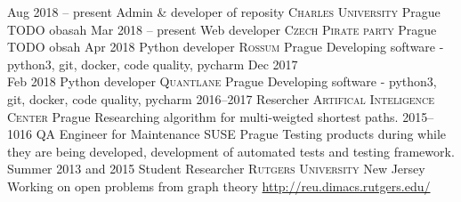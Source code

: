 \cventry
    {Aug 2018 -- present}
    {Admin \& developer of reposity}
    {\textsc{Charles University}}
    {Prague}
    {}
    {TODO obasah}
\cventry
    {Mar 2018 -- present}
    {Web developer}
    {\textsc{Czech Pirate party}}
    {Prague}
    {}
    {TODO obsah}
\cventry
    {Apr 2018}
    {Python developer}
    {\textsc{Rossum}}
    {Prague}
    {}
    {Developing software - python3, git, docker, code quality, pycharm}
\cventry
    {Dec 2017 \\ Feb 2018}
    {Python developer}
    {\textsc{Quantlane}}
    {Prague}
    {}
    {Developing software - python3, git, docker, code quality, pycharm}
\cventry
    {2016--2017}
    {Resercher}
    {\textsc{Artifical Inteligence Center}}
    {Prague}
    {}
    {Researching algorithm for multi-weigted shortest paths.}
\cventry
    {2015--1016}
    {QA Engineer for Maintenance}
    {\textsc{SUSE}}
    {Prague}
    {}
    {Testing products during while they are being developed, development of automated tests and testing framework.}
\cventry
    {Summer 2013 and 2015}
    {Student Researcher}
    {\textsc{Rutgers University}}
    {New Jersey}
    {Working on open problems from graph theory} 
    {\url{http://reu.dimacs.rutgers.edu/}}




